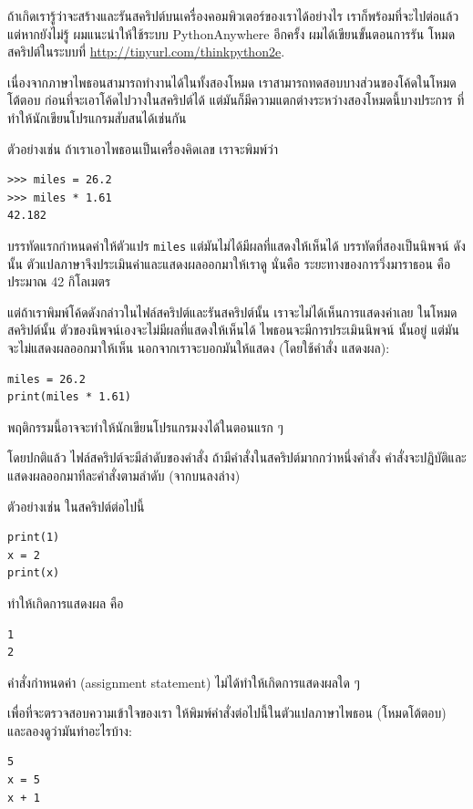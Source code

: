 ถ้าเกิดเรารู้ว่าจะสร้างและรันสคริปต์บนเครื่องคอมพิวเตอร์ของเราได้อย่างไร เราก็พร้อมที่จะไปต่อแล้ว
แต่หากยังไม่รู้ ผมแนะนำให้ใช้ระบบ PythonAnywhere อีกครั้ง ผมได้เขียนขั้นตอนการรัน
โหมดสคริปต์ในระบบที่ \url{http://tinyurl.com/thinkpython2e}.

เนื่องจากภาษาไพธอนสามารถทำงานได้ในทั้งสองโหมด เราสามารถทดสอบบางส่วนของโค้ดในโหมดโต้ตอบ
ก่อนที่จะเอาโค้ดไปวางในสคริปต์ได้ แต่มันก็มีความแตกต่างระหว่างสองโหมดนี้บางประการ
ที่ทำให้นักเขียนโปรแกรมสับสนได้เช่นกัน

ตัวอย่างเช่น ถ้าเราเอาไพธอนเป็นเครื่องคิดเลข เราจะพิมพ์ว่า

\begin{verbatim}
>>> miles = 26.2
>>> miles * 1.61
42.182
\end{verbatim}

บรรทัดแรกกำหนดค่าให้ตัวแปร {\tt miles} แต่มันไม่ได้มีผลที่แสดงให้เห็นได้
บรรทัดที่สองเป็นนิพจน์ ดังนั้น ตัวแปลภาษาจึงประเมินค่าและแสดงผลออกมาให้เราดู 
นั่นคือ ระยะทางของการวิ่งมาราธอน คือ ประมาณ 42 กิโลเมตร

แต่ถ้าเราพิมพ์โค้ดดังกล่าวในไฟล์สคริปต์และรันสคริปต์นั้น เราจะไม่ได้เห็นการแสดงค่าเลย
ในโหมดสคริปต์นั้น ตัวของนิพจน์เองจะไม่มีผลที่แสดงให้เห็นได้ ไพธอนจะมีการประเมินนิพจน์
นั้นอยู่ แต่มันจะไม่แสดงผลออกมาให้เห็น นอกจากเราจะบอกมันให้แสดง (โดยใช้คำสั่ง
แสดงผล): 

\begin{verbatim}
miles = 26.2
print(miles * 1.61)
\end{verbatim}

พฤติกรรมนี้อาจจะทำให้นักเขียนโปรแกรมงงได้ในตอนแรก ๆ

โดยปกติแล้ว ไฟล์สคริปต์จะมีลำดับของคำสั่ง ถ้ามีคำสั่งในสคริปต์มากกว่าหนึ่งคำสั่ง 
คำสั่งจะปฏิบัติและแสดงผลออกมาทีละคำสั่งตามลำดับ (จากบนลงล่าง)

ตัวอย่างเช่น ในสคริปต์ต่อไปนี้

\begin{verbatim}
print(1)
x = 2
print(x)
\end{verbatim}
%
ทำให้เกิดการแสดงผล คือ

\begin{verbatim}
1
2
\end{verbatim}
%
คำสั่งกำหนดค่า (assignment statement) ไม่ได้ทำให้เกิดการแสดงผลใด ๆ

เพื่อที่จะตรวจสอบความเข้าใจของเรา ให้พิมพ์คำสั่งต่อไปนี้ในตัวแปลภาษาไพธอน (โหมดโต้ตอบ) 
และลองดูว่ามันทำอะไรบ้าง:

\begin{verbatim}
5
x = 5
x + 1
\end{verbatim}

